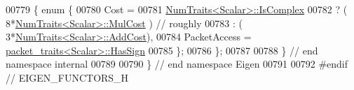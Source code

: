 \begin{DoxyCode}
00779 \{ \textcolor{keyword}{enum} \{
00780     Cost = 
00781         \hyperlink{group___core___module_struct_eigen_1_1_num_traits}{NumTraits<Scalar>::IsComplex}
00782         ? ( 8*\hyperlink{group___core___module_struct_eigen_1_1_num_traits}{NumTraits<Scalar>::MulCost}  ) \textcolor{comment}{// roughly}
00783         : ( 3*\hyperlink{group___core___module_struct_eigen_1_1_num_traits}{NumTraits<Scalar>::AddCost}),
00784     PacketAccess = \hyperlink{struct_eigen_1_1internal_1_1packet__traits}{packet\_traits<Scalar>::HasSign}
00785   \};
00786 \};
00787 
00788 \} \textcolor{comment}{// end namespace internal}
00789 
00790 \} \textcolor{comment}{// end namespace Eigen}
00791 
00792 \textcolor{preprocessor}{#endif // EIGEN\_FUNCTORS\_H}
\end{DoxyCode}
